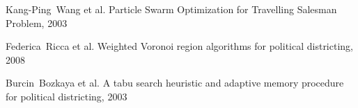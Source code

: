 \documentclass[journal]{IEEEtran}
\begin{document}








\begin{thebibliography}{1}

Kang-Ping~Wang et al. Particle Swarm Optimization for Travelling Salesman
        Problem, 2003

Federica~Ricca et al. Weighted Voronoi region algorithms for political
        districting, 2008

    Burcin~Bozkaya et al.  A tabu search heuristic and adaptive memory procedure
        for political districting, 2003
\end{thebibliography}
\end{document}
